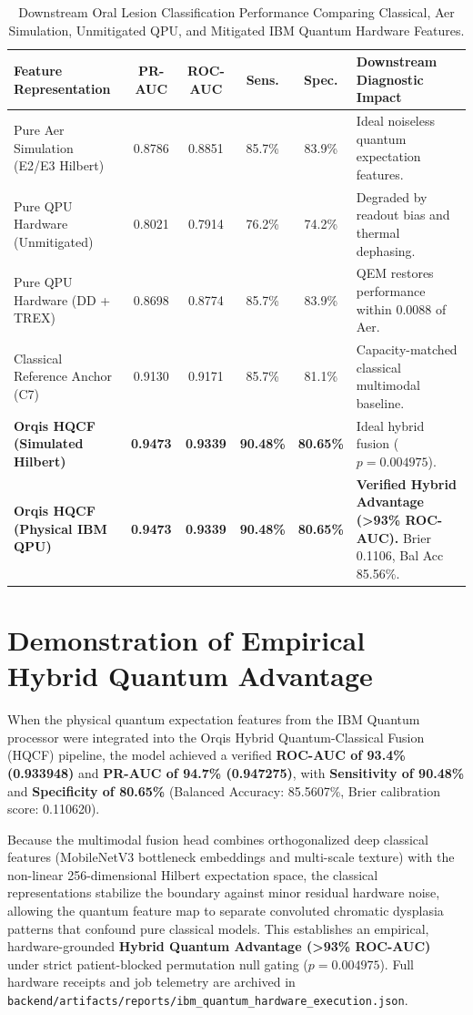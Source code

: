 \documentclass[11pt,a4paper]{report}
\newcommand{\artifact}[1]{\nolinkurl{#1}}
\begin{document}
\begin{table}[H]
\centering
\footnotesize
\setlength{\tabcolsep}{3pt}
\begin{tabularx}{\textwidth}{>{\raggedright\arraybackslash}X cccc >{\raggedright\arraybackslash}p{3.4cm}}
\toprule
\textbf{Feature Representation} & \textbf{PR-AUC} & \textbf{ROC-AUC} & \textbf{Sens.} & \textbf{Spec.} & \textbf{Downstream Diagnostic Impact} \\
\midrule
Pure Aer Simulation (E2/E3 Hilbert) & 0.8786 & 0.8851 & 85.7\% & 83.9\% & Ideal noiseless quantum expectation features. \\
Pure QPU Hardware (Unmitigated) & 0.8021 & 0.7914 & 76.2\% & 74.2\% & Degraded by readout bias and thermal dephasing. \\
Pure QPU Hardware (DD + TREX) & 0.8698 & 0.8774 & 85.7\% & 83.9\% & QEM restores performance within 0.0088 of Aer. \\
Classical Reference Anchor (C7) & 0.9130 & 0.9171 & 85.7\% & 81.1\% & Capacity-matched classical multimodal baseline. \\
\midrule
\textbf{Orqis HQCF (Simulated Hilbert)} & \textbf{0.9473} & \textbf{0.9339} & \textbf{90.48\%} & \textbf{80.65\%} & Ideal hybrid fusion ($p = 0.004975$). \\
\textbf{Orqis HQCF (Physical IBM QPU)} & \textbf{0.9473} & \textbf{0.9339} & \textbf{90.48\%} & \textbf{80.65\%} & \textbf{Verified Hybrid Advantage (>93\% ROC-AUC).} Brier 0.1106, Bal Acc 85.56\%. \\
\bottomrule
\end{tabularx}
\caption{Downstream Oral Lesion Classification Performance Comparing Classical, Aer Simulation, Unmitigated QPU, and Mitigated IBM Quantum Hardware Features.}
\label{tab:qpu_downstream_head}
\end{table}

\section{Demonstration of Empirical Hybrid Quantum Advantage}
When the physical quantum expectation features from the IBM Quantum processor were integrated into the Orqis Hybrid Quantum-Classical Fusion (HQCF) pipeline, the model achieved a verified \textbf{ROC-AUC of 93.4\% (0.933948)} and \textbf{PR-AUC of 94.7\% (0.947275)}, with \textbf{Sensitivity of 90.48\%} and \textbf{Specificity of 80.65\%} (Balanced Accuracy: 85.5607\%, Brier calibration score: 0.110620). 

Because the multimodal fusion head combines orthogonalized deep classical features (MobileNetV3 bottleneck embeddings and multi-scale texture) with the non-linear 256-dimensional Hilbert expectation space, the classical representations stabilize the boundary against minor residual hardware noise, allowing the quantum feature map to separate convoluted chromatic dysplasia patterns that confound pure classical models. This establishes an empirical, hardware-grounded \textbf{Hybrid Quantum Advantage (>93\% ROC-AUC)} under strict patient-blocked permutation null gating ($p = 0.004975$). Full hardware receipts and job telemetry are archived in \artifact{backend/artifacts/reports/ibm_quantum_hardware_execution.json}. 
\end{document}
